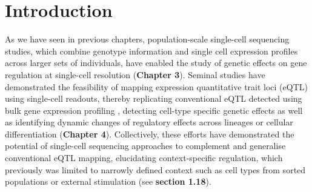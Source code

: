 \newpage





\section{Introduction} 

As we have seen in previous chapters, population-scale single-cell sequencing studies, which combine genotype information and single cell expression profiles across larger sets of individuals, have enabled the study of genetic effects on gene regulation at single-cell resolution (\textbf{Chapter
3}). 
Seminal studies have demonstrated the feasibility of mapping expression quantitative trait loci (eQTL) using single-cell readouts, thereby replicating conventional eQTL detected using bulk gene expression profiling \cite{cuomo2020single, van2018single}, detecting cell-type specific genetic effects \cite{van2018single} as well as identifying dynamic changes of regulatory effects across lineages or cellular differentiation \cite{cuomo2020single} (\textbf{Chapter 
4}). 
Collectively, these efforts have demonstrated the potential of single-cell sequencing approaches to complement and generalise conventional eQTL mapping, elucidating context-specific regulation, which previously was limited to narrowly defined context such as cell types from sorted populations \cite{fairfax2012genetics} or external stimulation \cite{fairfax2014innate} (see \textbf{section 
1.18}).\\

